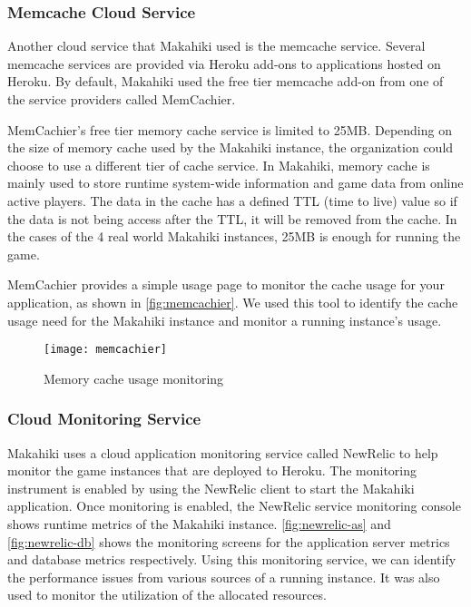 \subsubsection{Memcache Cloud Service}

Another cloud service that Makahiki used is the memcache service. Several memcache services are provided via Heroku add-ons to applications hosted on Heroku. By default, Makahiki used the free tier memcache add-on from one of the service providers called MemCachier\cite{memcachier}. 

MemCachier's free tier memory cache service is limited to 25MB. Depending on the size of memory cache used by the Makahiki instance, the organization could choose to use a different tier of cache service. In Makahiki, memory cache is mainly used to store  runtime system-wide information and game data from online active players. The data in the cache has a defined TTL (time to live) value so if the data is not being access after the TTL, it will be removed from the cache. In the cases of the 4 real world Makahiki instances, 25MB is enough for running the game.

MemCachier provides a simple usage page to monitor the cache usage for your application, as shown in \autoref{fig:memcachier}. We used this tool to identify the cache usage need for the Makahiki instance and monitor a running instance's usage.

\begin{figure}[ht!]
  \center
  \texttt{[image: memcachier]}
  \caption{Memory cache usage monitoring}
  \label{fig:memcachier}
\end{figure}

\subsubsection{Cloud Monitoring Service}

Makahiki uses a cloud application monitoring service called NewRelic to help monitor the game instances that are deployed to Heroku. The monitoring instrument is enabled by using the NewRelic client to start the Makahiki application. Once monitoring is enabled, the NewRelic service monitoring console shows runtime metrics of the Makahiki instance. \autoref{fig:newrelic-as} and \autoref{fig:newrelic-db} shows the monitoring screens for the application server metrics and database metrics respectively. Using this monitoring service, we can identify the performance issues from various sources of a running instance. It was also used to monitor the utilization of the allocated resources.

